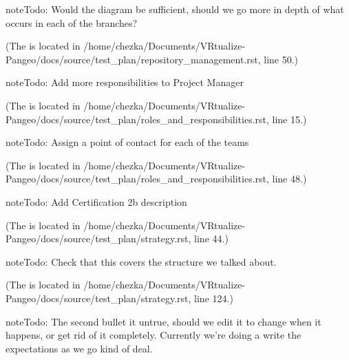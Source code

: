 \documentclass[letterpaper,10pt,english]{sphinxmanual}
\begin{document}
\begin{sphinxadmonition}{note}{Todo:}
Would the diagram be sufficient, should we go more in depth of what occurs in each of the branches?
\end{sphinxadmonition}

(The {\hyperref[\detokenize{test_plan/repository_management:index-0}]{}} is located in /home/chezka/Documents/VRtualize-Pangeo/docs/source/test\_plan/repository\_management.rst, line 50.)

\begin{sphinxadmonition}{note}{Todo:}
Add more responsibilities to Project Manager
\end{sphinxadmonition}

(The {\hyperref[\detokenize{test_plan/roles_and_responsibilities:index-0}]{}} is located in /home/chezka/Documents/VRtualize-Pangeo/docs/source/test\_plan/roles\_and\_responsibilities.rst, line 15.)

\begin{sphinxadmonition}{note}{Todo:}
Assign a point of contact for each of the teams
\end{sphinxadmonition}

(The {\hyperref[\detokenize{test_plan/roles_and_responsibilities:index-1}]{}} is located in /home/chezka/Documents/VRtualize-Pangeo/docs/source/test\_plan/roles\_and\_responsibilities.rst, line 48.)

\begin{sphinxadmonition}{note}{Todo:}
Add Certification 2b description
\end{sphinxadmonition}

(The {\hyperref[\detokenize{test_plan/strategy:index-0}]{}} is located in /home/chezka/Documents/VRtualize-Pangeo/docs/source/test\_plan/strategy.rst, line 44.)

\begin{sphinxadmonition}{note}{Todo:}
Check that this covers the structure we talked about.
\end{sphinxadmonition}

(The {\hyperref[\detokenize{test_plan/strategy:index-1}]{}} is located in /home/chezka/Documents/VRtualize-Pangeo/docs/source/test\_plan/strategy.rst, line 124.)

\begin{sphinxadmonition}{note}{Todo:}
The second bullet it untrue, should we edit it to change when it happens, or get rid of it completely. Currently we’re doing a write the expectations as we go kind of deal.
\end{sphinxadmonition}
\end{document}
